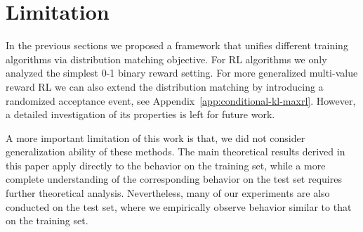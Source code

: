 \section{Limitation}

In the previous sections we proposed a framework that unifies different training algorithms via distribution matching objective. For RL algorithms we only analyzed the simplest 0-1 binary reward setting. For more generalized multi-value reward RL we can also extend the distribution matching by introducing a randomized acceptance event, see Appendix~\ref{app:conditional-kl-maxrl}. However, a detailed investigation of its properties is left for future work.

A more important limitation of this work is that, we did not consider generalization ability of these methods. The main theoretical results derived in this paper apply directly to the behavior on the training set, while a more complete understanding of the corresponding behavior on the test set requires further theoretical analysis. Nevertheless, many of our experiments are also conducted on the test set, where we empirically observe behavior similar to that on the training set.

